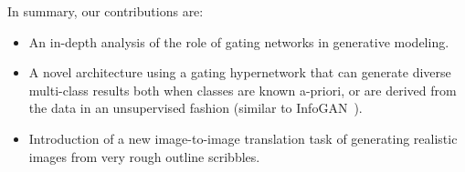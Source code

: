 
%



In summary, our contributions are:
\begin{itemize}
\item An in-depth analysis of the role of gating networks in generative modeling.
\item A novel architecture using a gating hypernetwork that can generate diverse multi-class results both when classes are known a-priori, or are derived from the data in an unsupervised fashion (similar to InfoGAN~\cite{chen2016infogan}).
\item Introduction of a new image-to-image translation task of generating realistic images from very rough outline scribbles.
\end{itemize}